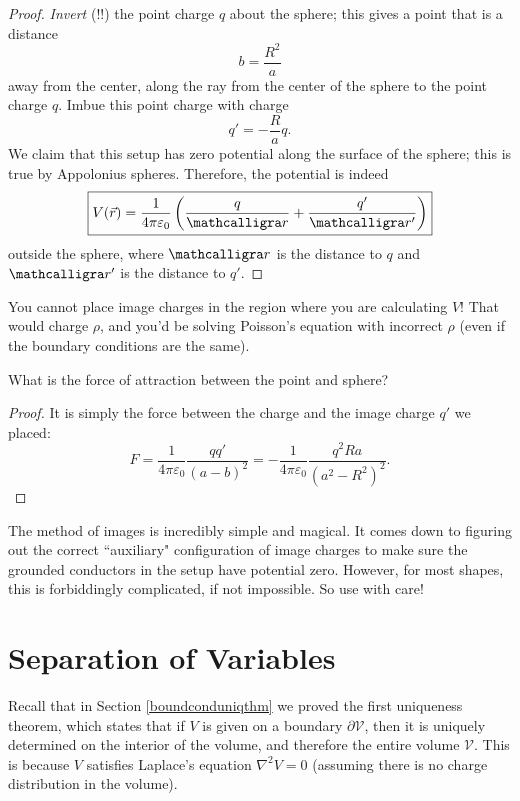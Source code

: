 \begin{proof}
\textit{Invert} (!!) the point charge $q$ about the sphere; this gives a point that is a distance 
\[b=\frac{R^2}{a}\]
away from the center, along the ray from the center of the sphere to the point charge $q$. Imbue this point charge with charge
\[q'=-\frac{R}{a}q.\]
We claim that this setup has zero potential along the surface of the sphere; this is true by Appolonius spheres. Therefore, the potential is indeed
\[\boxed{V(\vec{r})=\frac{1}{4\pi\varepsilon_0}\left(\frac{q}{\scr}+\frac{q'}{\scr'}\right)}\]
outside the sphere, where $\scr$ is the distance to $q$ and $\scr'$ is the distance to $q'$.
\end{proof}

\begin{remark}
You cannot place image charges in the region where you are calculating $V$! That would charge $\rho$, and you'd be solving Poisson's equation with incorrect $\rho$ (even if the boundary conditions are the same).
\end{remark}

\begin{example}
What is the force of attraction between the point and sphere?
\end{example}

\begin{proof}
It is simply the force between the charge and the image charge $q'$ we placed:
\[F=\frac{1}{4\pi\varepsilon_0}\frac{qq'}{(a-b)^2}=\boxed{-\frac{1}{4\pi\varepsilon_0}\frac{q^2Ra}{(a^2-R^2)^2}}.\]
\end{proof}

The method of images is incredibly simple and magical. It comes down to figuring out the correct ``auxiliary" configuration of image charges to make sure the grounded conductors in the setup have potential zero. However, for most shapes, this is forbiddingly complicated, if not impossible. So use with care!

\section{Separation of Variables}

Recall that in Section \ref{boundconduniqthm} we proved the first uniqueness theorem, which states that if $V$ is given on a boundary $\partial\mathcal{V}$, then it is uniquely determined on the interior of the volume, and therefore the entire volume $\mathcal{V}$. This is because $V$ satisfies Laplace's equation $\nabla^2 V=0$ (assuming there is no charge distribution in the volume).

